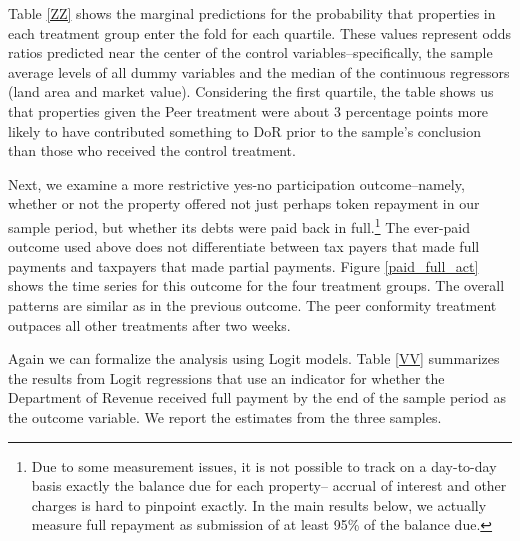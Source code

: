 \documentclass[12pt,titlepage]{article}
\begin{document}
Table \ref{ZZ} shows the marginal predictions for the probability that
properties in each treatment group enter the fold for each
quartile. These values represent odds ratios predicted near the 
center of the control variables--specifically, the sample average levels of
all dummy variables and the median of the continuous regressors 
(land area and market value). Considering the first quartile, the table shows us that
properties given the Peer treatment were about 3 percentage points
more likely to have contributed something to DoR prior to the sample's
conclusion than those who received the control treatment.

Next, we examine a more restrictive yes-no participation
outcome--namely, whether or not the property offered not just perhaps token
repayment in our sample period, but whether its debts were paid back
in full.\footnote{Due to some measurement issues, it is not possible
  to track on a day-to-day basis exactly the balance due for each
  property-- accrual of interest and other charges is hard to pinpoint
  exactly. In the main results below, we actually measure full
  repayment as submission of at least 95\% of the balance due.}  The
ever-paid outcome used above does not differentiate between tax payers that made
full payments and taxpayers that made partial payments. Figure
\ref{paid_full_act} shows the time series for this outcome for the
four treatment groups. The overall patterns are similar as in the
previous outcome. The peer conformity treatment outpaces all other
treatments after two weeks.

Again we can formalize the analysis using Logit models. Table \ref{VV}
summarizes the results from Logit regressions that use an indicator
for whether the Department of Revenue received full payment by the end
of the sample period as the outcome variable. We report the estimates
from the three samples.
\end{document}
